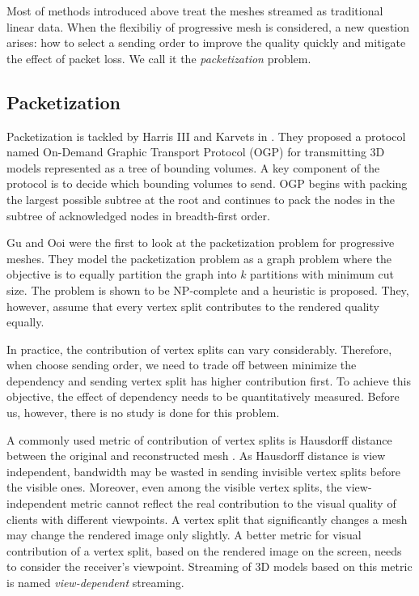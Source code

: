 \documentclass[11pt, a4paper]{report}
\begin{document}
    Most of methods introduced above treat the meshes streamed as 
    traditional linear data. When the flexibiliy of progressive mesh
    is considered, a new question arises: how to select a sending order
    to improve the quality quickly and mitigate the effect of packet loss.
    We call it the \emph{packetization} problem.
    
    \subsection{Packetization}
    \label{ss:intro:packetization}
    Packetization is tackled by
    Harris III and Karvets in \cite{harris:design}.   
    They proposed a protocol named On-Demand Graphic Transport Protocol (OGP)
    for transmitting 3D models represented as a tree of bounding volumes.
    A key component of the protocol is to decide which bounding volumes
    to send.  OGP begins with packing the largest possible subtree at
    the root and continues to pack the nodes in the subtree of
    acknowledged nodes in breadth-first order.  
    
    Gu and Ooi \cite{Gu:Packetization} were the first to look at
    the packetization problem for progressive meshes.  They model
    the packetization problem as a graph problem where the objective
    is to equally partition the graph into $k$ partitions with minimum
    cut size.  The problem is shown to be NP-complete and a heuristic
    is proposed.  They, however, assume that every vertex split contributes 
    to the rendered quality equally.
    
    In practice, the contribution of vertex splits can
    vary considerably. Therefore, when choose sending order, we
    need to trade off between minimize the dependency and sending 
    vertex split has higher contribution first. To achieve this objective,
    the effect of dependency needs to be quantitatively measured.
    Before us, however, there is no study is done for this problem.

    A commonly used metric of contribution of vertex splits is 
    Hausdorff distance between the original and reconstructed mesh \cite{cignoni98metro}.
    As Hausdorff distance is view independent, 
    bandwidth may be wasted in sending invisible vertex splits
    before the visible ones. Moreover, even among the visible vertex splits,
    the view-independent metric cannot reflect the real contribution to the visual quality of
    clients with different viewpoints. A vertex split that significantly
    changes a mesh may change the rendered image 
    only slightly.  A better metric for visual contribution of a vertex split,
    based on the rendered image on the screen, 
    needs to consider the receiver's viewpoint.
    Streaming of 3D models based on this metric is named \emph{view-dependent} streaming.
\end{document}
